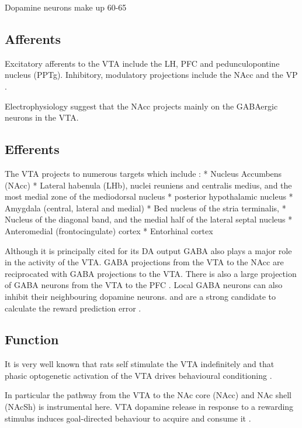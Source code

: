 \documentclass[12pt,a4paper]{article}
\begin{document}
Dopamine neurons make up 60-65%

\subsection{Afferents}

Excitatory afferents to the VTA include the LH, PFC and pedunculopontine nucleus
(PPTg). Inhibitory, modulatory projections include the NAcc and the VP \citep{Sesack2010}.

Electrophysiology suggest that the NAcc projects mainly on the GABAergic neurons in the VTA.

\subsection{Efferents}

The VTA projects to numerous targets which include \citep{Beckstead1979}:
  * Nucleus Accumbens (NAcc)
  * Lateral habenula (LHb), nuclei reuniens and centralis medius, and the most medial zone of the mediodorsal nucleus 
  * posterior hypothalamic nucleus 
  * Amygdala (central, lateral and medial)
  * Bed nucleus of the stria terminalis, 
  * Nucleus of the diagonal band, and the medial half of the lateral septal nucleus
  * Anteromedial (frontocingulate) cortex
  * Entorhinal cortex

Although it is principally cited for its DA output GABA also plays a major role in the activity of the VTA. 
GABA projections from the VTA to the NAcc are reciprocated with GABA projections to the VTA. There is also a large projection of GABA neurons from the VTA to the PFC \citep{Carr2000}. Local GABA neurons can also inhibit their neighbouring dopamine neurons.\citep{Sesack2010} and are a strong candidate to calculate the reward prediction error \citep{Eshel2015}.


\subsection{Function}

It is very well known that rats self stimulate the VTA indefinitely \citep{Stuber2016} and that phasic optogenetic activation of the VTA drives behavioural conditioning \citep{Tsai2009}.

In particular the pathway from the VTA to the NAc core (NAcc) and NAc shell (NAcSh) is instrumental here. VTA dopamine release in response to a rewarding stimulus induces goal-directed behaviour to acquire and consume it \citep{Morales2017}.
\end{document}
